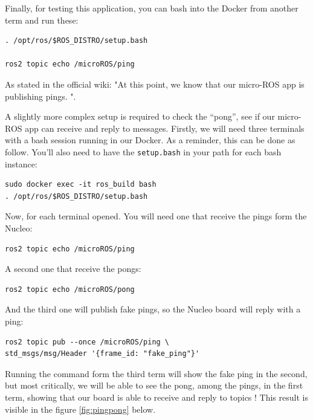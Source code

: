 \documentclass[10pt]{article}
\begin{document}
Finally, for testing this application, you can bash into the Docker from another term and run these:
\begin{tcolorbox}
\begin{verbatim}
. /opt/ros/$ROS_DISTRO/setup.bash

ros2 topic echo /microROS/ping
\end{verbatim}
\end{tcolorbox}
As stated in the official wiki: "At this point, we know that our micro-ROS app is publishing pings. ".

A slightly more complex setup is required to check the ``pong'', see if our micro-ROS app can receive and reply to messages.
Firstly, we will need three terminals with a bash session running in our Docker. As a reminder, this can be done as follow. You'll also need to have the \verb|setup.bash| in your path for each bash instance:
\begin{tcolorbox}
\begin{verbatim}
sudo docker exec -it ros_build bash
. /opt/ros/$ROS_DISTRO/setup.bash
\end{verbatim}
\end{tcolorbox}

Now, for each terminal opened.
You will need one that receive the pings form the Nucleo:
\begin{tcolorbox}
\begin{verbatim}
ros2 topic echo /microROS/ping
\end{verbatim}
\end{tcolorbox}

A second one that receive the pongs:
\begin{tcolorbox}
\begin{verbatim}
ros2 topic echo /microROS/pong
\end{verbatim}
\end{tcolorbox}

And the third one will publish fake pings, so the Nucleo board will reply with a ping:
\begin{tcolorbox}
\begin{verbatim}
ros2 topic pub --once /microROS/ping \
std_msgs/msg/Header '{frame_id: "fake_ping"}'
\end{verbatim}
\end{tcolorbox}

Running the command form the third term will show the fake ping in the second, but most critically, we will be able to see the pong, among the pings, in the first term, showing that our board is able to receive and reply to topics ! This result is visible in the figure \ref{fig:pingpong} below.
\end{document}
